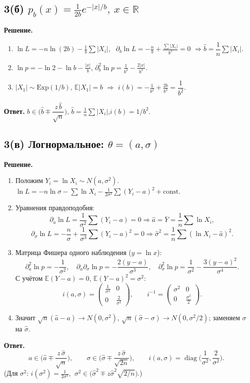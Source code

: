 \documentclass[12pt,a4paper]{article}
\newcommand{\E}{\mathbb{E}}
\newcommand{\sol}{\par\noindent\textbf{Решение.} }
\newcommand{\ans}{\par\smallskip\noindent\textbf{Ответ.} }
\begin{document}
\subsection*{3(б) \quad $p_b(x)=\frac1{2b}e^{-|x|/b},\ x\in\mathbb R$}
\sol
\begin{enumerate}
  \item $\ln L=-n\ln(2b)-\frac1b\sum|X_i|$,
        \ $\partial_b\ln L=-\frac nb+\frac{\sum|X_i|}{b^2}=0$
        $\Rightarrow\hat b=\dfrac1n\sum|X_i|$.
  \item $\ln p=-\ln2-\ln b-\frac{|x|}b$,\quad
        $\partial_b^2\ln p=\frac1{b^2}-\frac{2|x|}{b^3}$.
  \item $|X_1|\sim\mathrm{Exp}(1/b)$, $\E|X_1|=b$ $\Rightarrow$
        $i(b)=-\frac1{b^2}+\frac{2b}{b^3}=\dfrac1{b^2}$.
\end{enumerate}
\ans $b\in\Big(\hat b\mp\dfrac{z\,\hat b}{\sqrt n}\Big)$,\quad
     $\hat b=\frac1n\sum|X_i|$,\quad $i(b)=1/b^2$.

\subsection*{3(в) \quad Логнормальное: $\theta=(a,\sigma)$}
\sol
\begin{enumerate}
  \item Положим $Y_i=\ln X_i\sim N(a,\sigma^2)$.
  $\ln L=-n\ln\sigma-\sum\ln X_i-\frac{1}{2\sigma^2}\sum(Y_i-a)^2+\text{const}$.
  \item Уравнения правдоподобия:
  \[
    \partial_a\ln L=\frac{1}{\sigma^2}\sum(Y_i-a)=0\Rightarrow\hat a=\bar Y=\frac1n\sum\ln X_i,
  \]
  \[
    \partial_\sigma\ln L=-\frac n\sigma+\frac1{\sigma^3}\sum(Y_i-a)^2=0
    \Rightarrow\hat\sigma^2=\frac1n\sum(\ln X_i-\hat a)^2.
  \]
  \item Матрица Фишера одного наблюдения ($y=\ln x$):
  \[
    \partial_a^2\ln p=-\frac1{\sigma^2},\quad
    \partial_a\partial_\sigma\ln p=-\frac{2(y-a)}{\sigma^3},\quad
    \partial_\sigma^2\ln p=\frac1{\sigma^2}-\frac{3(y-a)^2}{\sigma^4}.
  \]
  С учётом $\E(Y-a)=0$, $\E(Y-a)^2=\sigma^2$:
  \[
    i(a,\sigma)=\begin{pmatrix}\frac1{\sigma^2}&0\\0&\frac2{\sigma^2}\end{pmatrix},
    \qquad i^{-1}=\begin{pmatrix}\sigma^2&0\\0&\frac{\sigma^2}2\end{pmatrix}.
  \]
  \item Значит $\sqrt n(\hat a-a)\to N(0,\sigma^2)$,
        $\sqrt n(\hat\sigma-\sigma)\to N(0,\sigma^2/2)$; заменяем $\sigma$
        на $\hat\sigma$.
\end{enumerate}
\ans
\[
  a\in\Big(\hat a\mp\frac{z\,\hat\sigma}{\sqrt n}\Big),\qquad
  \sigma\in\Big(\hat\sigma\mp\frac{z\,\hat\sigma}{\sqrt{2n}}\Big),
  \qquad i(a,\sigma)=\operatorname{diag}\Big(\frac1{\sigma^2},\frac2{\sigma^2}\Big).
\]
(Для $\sigma^2$: $i(\sigma^2)=\frac1{2\sigma^4}$,
$\ \sigma^2\in\big(\hat\sigma^2\mp z\hat\sigma^2\sqrt{2/n}\big)$.)
\end{document}
